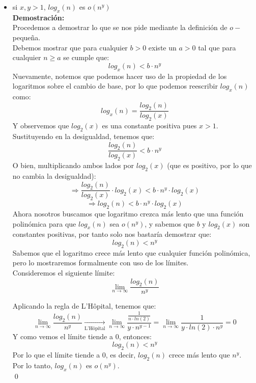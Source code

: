 \documentclass[12pt]{article}
\begin{document}
\begin{itemize}
\begin{itemize}
            \item si $x, y > 1$, $log_x(n)$ es $o(n^y)$\\
            \textbf{Demostración:}\\
            Procedemos a demostrar lo que se nos pide mediante la definición de $o-$pequeña.\\
            Debemos mostrar que para cualquier $b > 0$ existe un $a > 0$ tal que para cualquier $n \geq a$ se cumple que:
            \[
            log_x(n) < b \cdot n^y
            \]
            Nuevamente, notemos que podemos hacer uso de la propiedad de los logaritmos sobre el cambio de base, por lo que podemos reescribir $log_x(n)$ como:
            \[
            log_x(n) = \frac{log_2(n)}{log_2(x)}
            \]
            Y observemos que $log_2(x)$ es una constante positiva pues $x > 1$.\\
            Sustituyendo en la desigualdad, tenemos que:
            \[
            \frac{log_2(n)}{log_2(x)} < b \cdot n^y
            \]
            O bien, multiplicando ambos lados por $log_2(x)$ (que es positivo, por lo que no cambia la desigualdad):
            \[
            \Rightarrow \frac{log_2(n)}{log_2(x)} \cdot log_2(x) < b \cdot n^y \cdot log_2(x)
            \]
            \[
            \Rightarrow log_2(n) < b \cdot n^y \cdot log_2(x)
            \]
            Ahora nosotros buscamos que logaritmo crezca más lento que una función polinómica para que $log_x(n)$ sea $o(n^y)$, y sabemos que $b$ y $log_2(x)$ son constantes positivas, por tanto solo nos bastaría demostrar que:
            \[
            log_2(n) < n^y
            \]
            Sabemos que el logaritmo crece más lento que cualquier función polinómica, pero lo mostraremos formalmente con uso de los límites.\\
            Consideremos el siguiente límite:
            \[
            \lim_{n \to \infty} \frac{log_2(n)}{n^y}
            \]
            
            Aplicando la regla de L'Hôpital, tenemos que:
            \[
            \lim_{n \to \infty} \frac{log_2(n)}
            {n^y} \xrightarrow[\text{L'Hôpital}]{} \lim_{n \to \infty} \frac{\frac{1}{n \cdot ln(2)}}{y \cdot n^{y-1}} = \lim_{n \to \infty} \frac{1}{y \cdot ln(2) \cdot n^y} = 0
            \]
            Y como vemos el límite tiende a 0, entonces:
            \[
            log_2(n) < n^y
            \]
            Por lo que el límite tiende a 0, es decir, $log_2(n)$ crece más lento que $n^y$.\\
            Por lo tanto, $log_x(n)$ es $o(n^y)$.\\
            \qed




\end{itemize}
\end{itemize}
\end{document}
